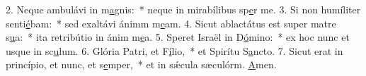 2. Neque ambulávi in m\uline{a}gnis:~* neque in mirabílibus sp\uline{e}r me.
3. Si non humíliter senti\uline{é}bam:~* sed exaltávi ánimm m\uline{e}am.
4. Sicut ablactátus est super matre s\uline{u}a:~* ita retribútio in ánim m\uline{e}a.
5. Speret Israël in D\uline{ó}mino:~* ex hoc nunc et usque in sc\uline{u}lum.
6. Glória Patri, et F\uline{í}lio,~* et Spirítu S\uline{a}ncto.
7. Sicut erat in princípio, et nunc, et s\uline{e}mper,~* et in sǽcula sæculórm. \uline{A}men.
